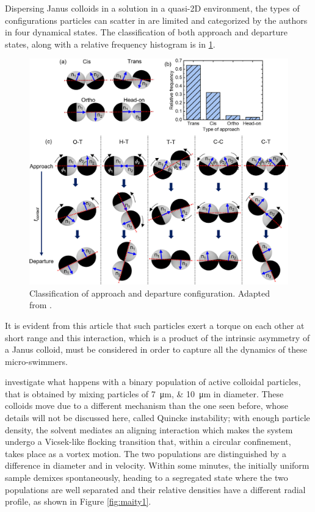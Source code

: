 \documentclass[../../master_thesis_np.tex]{subfiles}
\begin{document}
	Dispersing Janus colloids in a  solution in a quasi-2D environment, the types of configurations particles can scatter in are limited and categorized by the authors in four dynamical states. 
	The classification of both approach and departure states, along with a relative frequency histogram is in \ref{fig:singh_pair1}.
	
	\begin{figure}[htp]
		\centering
		\includegraphics[width=\singfigwidth]{singh_pair1.jpeg}
		\caption{Classification of approach and departure configuration. Adapted from \cite{singh_pair_2024}.}
		\label{fig:singh_pair1}
	\end{figure}
	
	It is evident from this article that such particles exert a torque on each other at short range and this interaction, which is a product of the intrinsic asymmetry of a Janus colloid, must be considered in order to capture all the dynamics of these micro-swimmers.
	
	\cite{maity_spontaneous_2023} investigate what happens with a binary population of active colloidal particles, that is obtained by mixing particles of \qtylist{7;10}{\um} in diameter. 
	These colloids move due to a different mechanism than the one seen before, whose details will not be discussed here, called Quincke instability; with enough particle density, the solvent mediates an aligning interaction which makes the system undergo a Vicsek-like flocking transition that, within a circular confinement, takes place as a vortex motion. 
	The two populations are distinguished by a difference in diameter and in velocity. 
	Within some minutes, the initially uniform sample demixes spontaneously, heading to a segregated state where the two populations are well separated and their relative densities have a different radial profile, as shown in Figure \ref{fig:maity1}.
	
\end{document}
